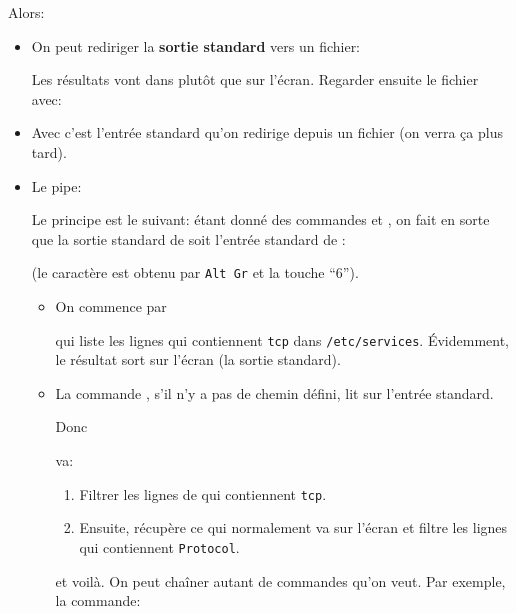 Alors:
\begin{itemize}
\item On peut rediriger la \textbf{sortie standard} vers un fichier:


Les résultats vont dans  plutôt que sur l'écran. Regarder
ensuite le fichier  avec:


\item Avec \com{<} c'est l'entrée standard qu'on redirige depuis un
  fichier (on verra ça plus tard).

\item Le \og pipe\fg{}:

  Le principe est le suivant: étant donné des
  commandes  et , on fait en sorte que la sortie standard
  de   soit l'entrée standard de :


  (le caractère \com{|} est obtenu par \texttt{Alt~Gr} et la touche ``6'').
  

  \begin{itemize}
  \item On commence par  

    qui liste les lignes qui contiennent \texttt{tcp} dans
    \texttt{/etc/services}. Évidemment, le résultat sort sur l'écran
    (la sortie standard).
    
  \item La commande , s'il n'y a pas de chemin défini, 
    lit sur l'entrée standard.

    Donc


    va:
    \begin{enumerate}
      \item Filtrer les lignes de  qui contiennent
        \texttt{tcp}.
      \item Ensuite,  récupère ce qui normalement
        va sur l'écran et filtre les lignes qui contiennent
        \texttt{Protocol}.
    \end{enumerate}
    et voilà. On peut chaîner autant de commandes qu'on veut. Par
    exemple, la commande:

    

\end{itemize}
\end{itemize}

